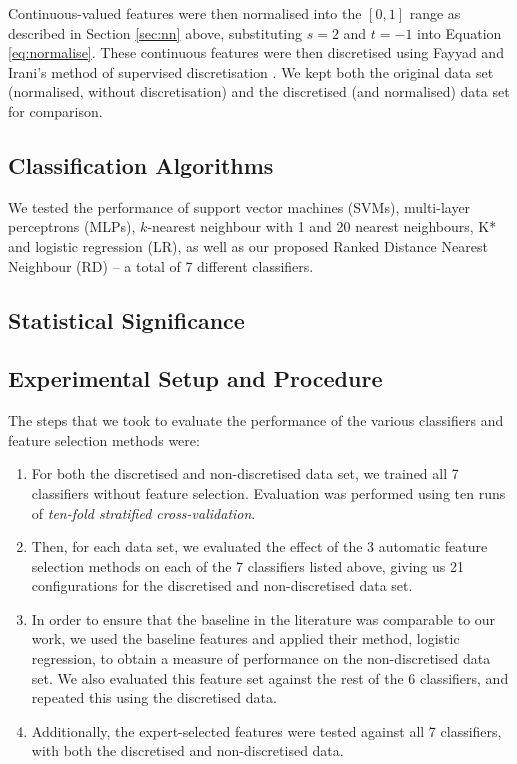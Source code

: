 \documentclass{article}
\begin{document}
Continuous-valued features were then normalised into the $[0,1]$ range as
described in Section \ref{sec:nn} above, substituting $s=2$ and $t=-1$ into
Equation \ref{eq:normalise}. These continuous features were then discretised
using Fayyad and Irani's method of supervised discretisation
\citep{Fayyad1993}. We kept both the original data set (normalised, without
discretisation) and the discretised (and normalised) data set for comparison.

\subsection{Classification Algorithms}
We tested the performance of
support vector machines (SVMs), multi-layer perceptrons (MLPs), $k$-nearest
neighbour with 1
and 20 nearest neighbours, K* and logistic regression (LR), as well as our
proposed
Ranked Distance Nearest Neighbour (RD) -- a total of 7 different classifiers.

\subsection{Statistical Significance}

\subsection{Experimental Setup and Procedure}
The steps that we took to evaluate the performance of the various classifiers
and feature selection methods were:
\begin{enumerate}
\item For both the discretised and non-discretised data set, we trained all 7
classifiers without feature selection. Evaluation was performed using ten runs
of \textit{ten-fold stratified cross-validation}.
\item Then, for each data set, we evaluated the effect of the 3 automatic
feature
selection methods on each of the 7 classifiers listed above, giving us 21
configurations for the discretised and non-discretised data set.
\item In order to ensure that the baseline in the literature was comparable
to our work, we used the baseline features and applied their method, logistic
regression, to obtain a measure of performance on the non-discretised data set.
We also evaluated this feature set against the rest of the 6 classifiers, and
repeated this using the discretised data.
\item Additionally, the expert-selected features were tested against all 7
classifiers, with both the discretised and non-discretised data.
\end{enumerate}
\end{document}
